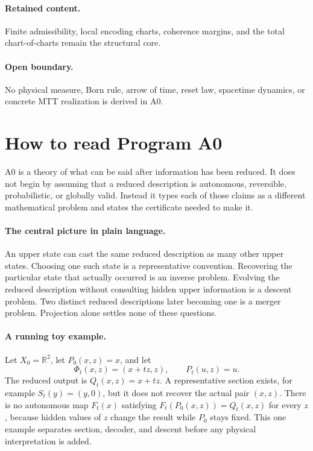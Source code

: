 \documentclass[11pt]{article}
\theoremstyle{plain}
\theoremstyle{plain}
\begin{document}
\paragraph{Retained content.}
Finite admissibility, local encoding charts,
coherence margins, and the total chart-of-charts remain the structural core.
\paragraph{Open boundary.}
No physical measure, Born rule, arrow of time, reset
law, spacetime dynamics, or concrete MTT realization is derived in A0.

\section*{How to read Program A0}
A0 is a theory of what can be said after information has been reduced.  It
does not begin by assuming that a reduced description is autonomous,
reversible, probabilistic, or globally valid.  Instead it types each of those
claims as a different mathematical problem and states the certificate needed
to make it.

\paragraph{The central picture in plain language.}
An upper state can cast the same reduced description as many other upper
states.  Choosing one such state is a representative convention.  Recovering
the particular state that actually occurred is an inverse problem.  Evolving
the reduced description without consulting hidden upper information is a
descent problem.  Two distinct reduced descriptions later becoming one is a
merger problem.  Projection alone settles none of these questions.

\paragraph{A running toy example.}
Let $X_0=\mathbb R^2$, let $P_0(x,z)=x$, and let
\[
\Phi_t(x,z)=(x+t z,z),\qquad P_t(u,z)=u.
\]
The reduced output is $Q_t(x,z)=x+t z$.  A representative section exists, for
example $S_t(y)=(y,0)$, but it does not recover the actual pair $(x,z)$.
There is no autonomous map $F_t(x)$ satisfying
$F_t(P_0(x,z))=Q_t(x,z)$ for every $z$, because hidden values of $z$ change
the result while $P_0$ stays fixed.  This one example separates section,
decoder, and descent before any physical interpretation is added.
\end{document}
